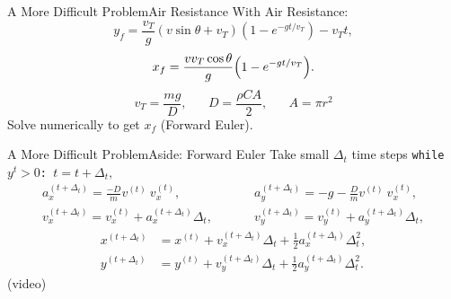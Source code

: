 \documentclass{beamer}
\begin{document}
\begin{frame}{A More Difficult Problem}{Air Resistance}
\vspace{-20pt}With Air Resistance:
\begin{equation*}
y_f=\frac{v_T}{g}(v\sin\theta+v_T)\left(1-e^{-gt/v_T}\right)-v_Tt,
\end{equation*}
\begin{equation*}
x_f=\frac{vv_T\cos\theta}{g}\qty(1-e^{-gt/v_T}).
\end{equation*}
\begin{equation*}
v_T=\frac{mg}{D},\hspace{20pt}D=\frac{\rho C A}{2},\hspace{20pt}A=\pi r^2
\end{equation*}
\hspace{30pt}Solve numerically to get $x_f$ (Forward Euler).
\end{frame}

\begin{frame}{A More Difficult Problem}{Aside: Forward Euler}
\vspace{-20pt}Take small $\Delta_t$ time steps
\texttt{while $y^t>0$: $t=t+\Delta_t,$}
\begin{align*}
a_{x}^{(t+\Delta_t)} = \frac{-D}{m}v^{(t)}\ v^{(t)}_{x},
        &\hspace{30pt}a_{y}^{(t+\Delta_t)} = -g-\frac{D}{m}v^{(t)}\ v^{(t)}_{x},\\[15pt]
v_{x}^{(t+\Delta_t)} =v_{x}^{(t)}+ a_{x}^{(t+\Delta_t)}\Delta_t,
        &\hspace{30pt}v_{y}^{(t+\Delta_t)} =v_{y}^{(t)}+ a_{y}^{(t+\Delta_t)}\Delta_t,
        \end{align*}
        \begin{align*}
x^{(t+\Delta_t)} &=x^{(t)}+ v^{(t+\Delta_t)}_{x}\Delta_t + \frac{1}{2}a^{(t+\Delta_t)}_{x} \Delta_t^2,\\
y^{(t+\Delta_t)} &=y^{(t)}+ v^{(t+\Delta_t)}_{y}\Delta_t + \frac{1}{2}a^{(t+\Delta_t)}_{y} \Delta_t^2.
\end{align*}
\hspace{50pt}(video)
\end{frame}
\end{document}
